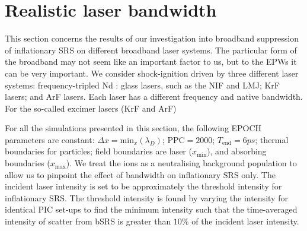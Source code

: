 \section{Realistic laser bandwidth}\label{sec:params}

This section concerns the results of our investigation into broadband suppression of inflationary SRS on different broadband laser systems. The particular form of the broadband may not seem like an important factor to us, but to the EPWs it can be very important.
We consider shock-ignition driven by three different laser systems: frequency-tripled Nd : glass lasers, such as the NIF and LMJ; KrF lasers; and ArF lasers. Each laser has a different frequency and native bandwidth. For the so-called excimer lasers (KrF and ArF) 

For all the simulations presented in this section, the following EPOCH parameters are constant: $\Delta x = \mathrm{min}_x(\lambda_D)$; $\mathrm{PPC} = 2000$; $T_{\mathrm{end}}=6\si{ps}$; thermal boundaries for particles; field boundaries are laser ($x_{\mathrm{min}}$), and absorbing boundaries ($x_{\mathrm{max}}$). We treat the ions as a neutralising background population to allow us to pinpoint the effect of bandwidth on inflationary SRS only. The incident laser intensity is set to be approximately the threshold intensity for inflationary SRS. The threshold intensity is found by varying the intensity for identical PIC set-ups to find the minimum intensity such that the time-averaged intensity of scatter from bSRS is greater than $10\%$ of the incident laser intensity. 

